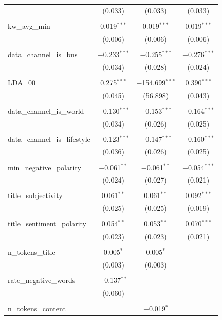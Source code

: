 \begin{table}[!htbp]
\begin{tabular}{@{\extracolsep{5pt}}lccc}
  & (0.033) & (0.033) & (0.033) \\ 
  & & & \\ 
 kw\_avg\_min & 0.019$^{***}$ & 0.019$^{***}$ & 0.019$^{***}$ \\ 
  & (0.006) & (0.006) & (0.006) \\ 
  & & & \\ 
 data\_channel\_is\_bus & $-$0.233$^{***}$ & $-$0.255$^{***}$ & $-$0.276$^{***}$ \\ 
  & (0.034) & (0.028) & (0.024) \\ 
  & & & \\ 
 LDA\_00 & 0.275$^{***}$ & $-$154.699$^{***}$ & 0.390$^{***}$ \\ 
  & (0.045) & (56.898) & (0.043) \\ 
  & & & \\ 
 data\_channel\_is\_world & $-$0.130$^{***}$ & $-$0.153$^{***}$ & $-$0.164$^{***}$ \\ 
  & (0.034) & (0.026) & (0.025) \\ 
  & & & \\ 
 data\_channel\_is\_lifestyle & $-$0.123$^{***}$ & $-$0.147$^{***}$ & $-$0.160$^{***}$ \\ 
  & (0.036) & (0.026) & (0.025) \\ 
  & & & \\ 
 min\_negative\_polarity & $-$0.061$^{**}$ & $-$0.061$^{**}$ & $-$0.054$^{***}$ \\ 
  & (0.024) & (0.027) & (0.021) \\ 
  & & & \\ 
 title\_subjectivity & 0.061$^{**}$ & 0.061$^{**}$ & 0.092$^{***}$ \\ 
  & (0.025) & (0.025) & (0.019) \\ 
  & & & \\ 
 title\_sentiment\_polarity & 0.054$^{**}$ & 0.053$^{**}$ & 0.070$^{***}$ \\ 
  & (0.023) & (0.023) & (0.021) \\ 
  & & & \\ 
 n\_tokens\_title & 0.005$^{*}$ & 0.005$^{*}$ &  \\ 
  & (0.003) & (0.003) &  \\ 
  & & & \\ 
 rate\_negative\_words & $-$0.137$^{**}$ &  &  \\ 
  & (0.060) &  &  \\ 
  & & & \\ 
 n\_tokens\_content &  & $-$0.019$^{*}$ &  \\ 

\end{tabular}
\end{table}
